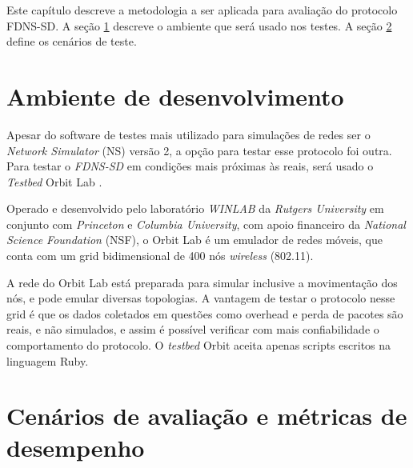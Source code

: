 
Este capítulo descreve a metodologia a ser aplicada para avaliação do protocolo
FDNS-SD. A seção \ref{ambiente} descreve o ambiente que será usado nos testes.
A seção \ref{cenarios} define os cenários de teste.

\section{Ambiente de desenvolvimento}
\label{ambiente}

    Apesar do software de testes mais utilizado para simulações de redes ser o
    \textit{Network Simulator} (NS) versão 2, a opção para testar esse protocolo
    foi outra. Para testar o \textit{FDNS-SD} em condições mais próximas às reais,
    será usado o \textit{Testbed} Orbit Lab \cite{orbit}.
    
    Operado e desenvolvido pelo laboratório \textit{WINLAB} \cite{winlab} da
    \textit{Rutgers University} em conjunto com \textit{Princeton} e
    \textit{Columbia University}, com apoio financeiro da \textit{National
    Science Foundation} (NSF), o Orbit Lab é um emulador de redes móveis, que
    conta com um grid bidimensional de 400 nós \textit{wireless} (802.11).

    A rede do Orbit Lab está preparada para simular inclusive a movimentação dos nós,
    e pode emular diversas topologias. A vantagem de testar o protocolo nesse grid é
    que os dados coletados em questões como overhead e perda de pacotes são reais, e
    não simulados, e assim é possível verificar com mais confiabilidade o comportamento
    do protocolo. O \textit{testbed} Orbit aceita apenas scripts escritos na linguagem
    Ruby.

\section{Cenários de avaliação e métricas de desempenho}
\label{cenarios}
